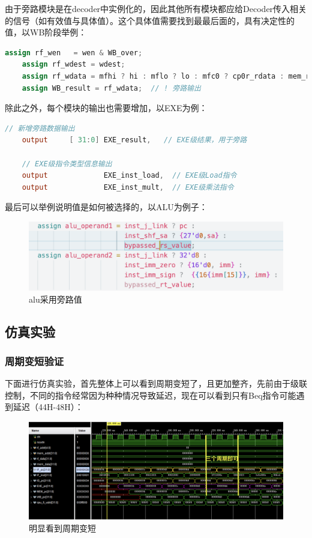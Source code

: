 \documentclass[a4paper]{article}
\begin{document}
由于旁路模块是在decoder中实例化的，因此其他所有模块都应给Decoder传入相关的信号（如有效值与具体值）。这个具体值需要找到最最后面的，具有决定性的值，以WB阶段举例：

\begin{lstlisting}[language=Verilog,caption={WB阶段向前传递的result}]
    assign rf_wen   = wen & WB_over;
    assign rf_wdest = wdest;
    assign rf_wdata = mfhi ? hi : mflo ? lo : mfc0 ? cp0r_rdata : mem_result;
    assign WB_result = rf_wdata;  // ! 旁路输出
\end{lstlisting}

除此之外，每个模块的输出也需要增加，以EXE为例：

\begin{lstlisting}[language=Verilog,caption={EXE模块新添加的信号}]
    // 新增旁路数据输出
    output     [ 31:0] EXE_result,   // EXE级结果，用于旁路
    
    // EXE级指令类型信息输出
    output             EXE_inst_load,  // EXE级Load指令
    output             EXE_inst_mult,  // EXE级乘法指令
\end{lstlisting}

最后可以举例说明值是如何被选择的，以ALU为例子：


\begin{figure}[H]
    \centering
    \includegraphics[width=0.8\linewidth]{img/旁路修改图片/alu用旁路的值.png}
    \caption{alu采用旁路值}
\end{figure}

\newpage

\subsection{仿真实验}

\subsubsection{周期变短验证}

下面进行仿真实验，首先整体上可以看到周期变短了，且更加整齐，先前由于级联控制，不同的指令经常因为种种情况导致延迟，现在可以看到只有Beq指令可能遇到延迟（44H-48H）：
\begin{figure}[H]
    \centering
    \includegraphics[width=0.9\linewidth]{img/旁路修改图片/明显看到周期变短.png}
    \caption{明显看到周期变短}
\end{figure}
\end{document}
